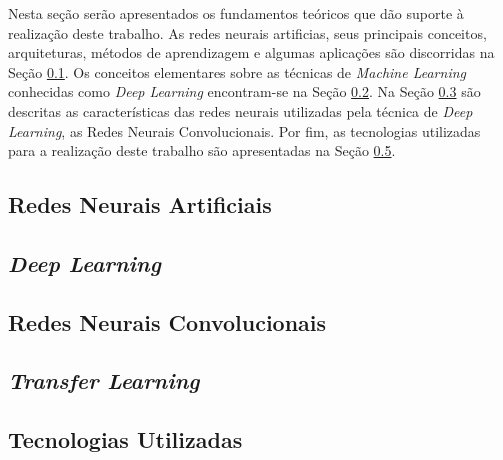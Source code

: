 Nesta seção serão apresentados os fundamentos teóricos que dão suporte à realização deste trabalho. As redes neurais artificias, seus principais conceitos, arquiteturas, métodos de aprendizagem e algumas aplicações são discorridas na Seção \ref{subsec:rna}. Os conceitos elementares sobre as técnicas de \textit{Machine Learning} conhecidas como \textit{Deep Learning} encontram-se na Seção \ref{subsec:deep}. Na Seção \ref{subsec:cnn} são descritas as características das redes neurais utilizadas pela técnica de \textit{Deep Learning}, as Redes Neurais Convolucionais. Por fim, as tecnologias utilizadas para a realização deste trabalho são apresentadas na Seção \ref{subsec:tecnologias}.

\subsection{Redes Neurais Artificiais} \label{subsec:rna}


\subsection{\textit{Deep Learning}} \label{subsec:deep}


\subsection{Redes Neurais Convolucionais} \label{subsec:cnn}


\subsection{\textit{Transfer Learning}} \label{subsec:transfer}


\subsection{Tecnologias Utilizadas} \label{subsec:tecnologias}




